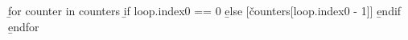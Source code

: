 \b{for counter in counters}
\b{if loop.index0 == 0}
\b{else}
[\v{counters[loop.index0 - 1]}]
\b{endif}
\b{endfor}
